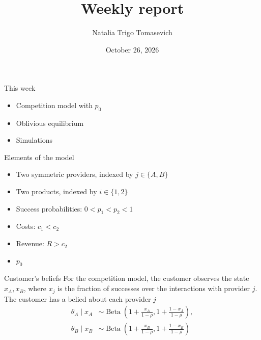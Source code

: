 \documentclass[10pt]{beamer}
\title{Weekly report}
\author{Natalia Trigo Tomasevich}
\date{October 26, 2026}
\begin{document}
\frame{\titlepage}

\begin{frame}{This week}
    \begin{itemize}[<+->]
        \item Competition model with $p_0$
        \item Oblivious equilibrium 
        \item Simulations 
    \end{itemize}
\end{frame}

\begin{frame}{Elements of the model}
    \begin{itemize}
        \item Two symmetric providers, indexed by $j\in\{A,B\}$
        \item Two products, indexed by $i\in\{1,2\}$
        \item Success probabilities: $0<p_1<p_2<1$
        \item Costs: $c_1<c_2$
        \item Revenue: $R>c_2$
        \item $p_0$
    \end{itemize}
\end{frame}

\begin{frame}{Customer's beliefs}
    For the competition model, the customer observes the state $x_A,x_B$, where $x_j$ is the fraction of successes over the interactions with provider $j$. The customer has a belied about each provider $j$
    \begin{align}
        \theta_A\mid x_A&\sim\operatorname{Beta}(1+\frac{x_A}{1-\rho},1+\frac{1-x_A}{1-\rho}),\\
        \theta_B\mid x_B&\sim\operatorname{Beta}(1+\frac{x_B}{1-\rho},1+\frac{1-x_B}{1-\rho})
    \end{align}
\end{frame}
\end{document}
